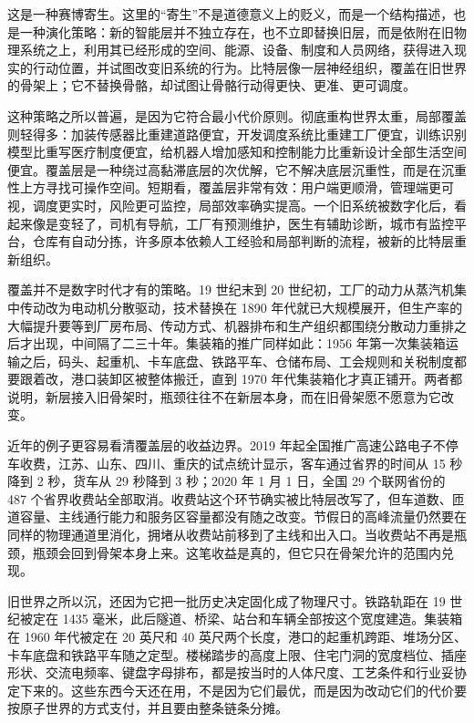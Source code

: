 这是一种赛博寄生。这里的“寄生”不是道德意义上的贬义，而是一个结构描述，也是一种演化策略：新的智能层并不独立存在，也不立即替换旧层，而是依附在旧物理系统之上，利用其已经形成的空间、能源、设备、制度和人员网络，获得进入现实的行动位置，并试图改变旧系统的行为。比特层像一层神经组织，覆盖在旧世界的骨架上；它不替换骨骼，却试图让骨骼行动得更快、更准、更可调度。

这种策略之所以普遍，是因为它符合最小代价原则。彻底重构世界太重，局部覆盖则轻得多：加装传感器比重建道路便宜，开发调度系统比重建工厂便宜，训练识别模型比重写医疗制度便宜，给机器人增加感知和控制能力比重新设计全部生活空间便宜。覆盖层是一种绕过高黏滞底层的次优解，它不解决底层沉重性，而是在沉重性上方寻找可操作空间。短期看，覆盖层非常有效：用户端更顺滑，管理端更可视，调度更实时，风险更可监控，局部效率确实提高。一个旧系统被数字化后，看起来像是变轻了，司机有导航，工厂有预测维护，医生有辅助诊断，城市有监控平台，仓库有自动分拣，许多原本依赖人工经验和局部判断的流程，被新的比特层重新组织。

覆盖并不是数字时代才有的策略。19 世纪末到 20 世纪初，工厂的动力从蒸汽机集中传动改为电动机分散驱动，技术替换在 1890 年代就已大规模展开，但生产率的大幅提升要等到厂房布局、传动方式、机器排布和生产组织都围绕分散动力重排之后才出现，中间隔了二三十年。集装箱的推广同样如此：1956 年第一次集装箱运输之后，码头、起重机、卡车底盘、铁路平车、仓储布局、工会规则和关税制度都要跟着改，港口装卸区被整体搬迁，直到 1970 年代集装箱化才真正铺开。两者都说明，新层接入旧骨架时，瓶颈往往不在新层本身，而在旧骨架愿不愿意为它改变。

近年的例子更容易看清覆盖层的收益边界。2019 年起全国推广高速公路电子不停车收费，江苏、山东、四川、重庆的试点统计显示，客车通过省界的时间从 15 秒降到 2 秒，货车从 29 秒降到 3 秒；2020 年 1 月 1 日，全国 29 个联网省份的 487 个省界收费站全部取消。收费站这个环节确实被比特层改写了，但车道数、匝道容量、主线通行能力和服务区容量都没有随之改变。节假日的高峰流量仍然要在同样的物理通道里消化，拥堵从收费站前移到了主线和出入口。当收费站不再是瓶颈，瓶颈会回到骨架本身上来。这笔收益是真的，但它只在骨架允许的范围内兑现。

旧世界之所以沉，还因为它把一批历史决定固化成了物理尺寸。铁路轨距在 19 世纪被定在 1435 毫米，此后隧道、桥梁、站台和车辆全部按这个宽度建造。集装箱在 1960 年代被定在 20 英尺和 40 英尺两个长度，港口的起重机跨距、堆场分区、卡车底盘和铁路平车随之定型。楼梯踏步的高度上限、住宅门洞的宽度档位、插座形状、交流电频率、键盘字母排布，都是按当时的人体尺度、工艺条件和行业妥协定下来的。这些东西今天还在用，不是因为它们最优，而是因为改动它们的代价要按原子世界的方式支付，并且要由整条链条分摊。

